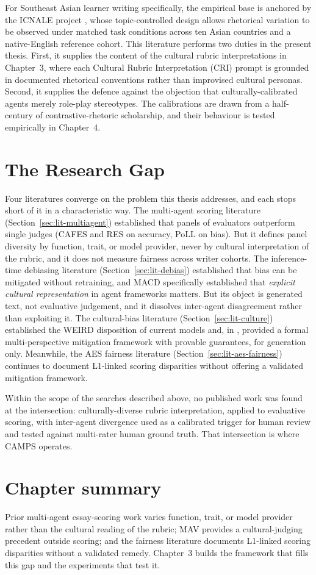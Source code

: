 For Southeast Asian learner writing specifically, the empirical base
is anchored by the ICNALE project \citep{ishikawa2023icnale}, whose
topic-controlled design allows rhetorical variation to be observed
under matched task conditions across ten Asian countries and a
native-English reference cohort. This literature performs two duties in
the present thesis. First, it supplies the content of the cultural rubric
interpretations in Chapter~3, where each Cultural Rubric
Interpretation (CRI) prompt is grounded in
documented rhetorical conventions rather than improvised cultural
personas. Second, it supplies the defence against the objection that
culturally-calibrated agents merely role-play stereotypes. The
calibrations are drawn from a half-century of contrastive-rhetoric
scholarship, and their behaviour is tested empirically in Chapter~4.

\section{The Research Gap}
\label{sec:lit-gap}

Four literatures converge on the problem this thesis addresses, and
each stops short of it in a characteristic way. The multi-agent scoring
literature (Section~\ref{sec:lit-multiagent}) established that panels
of evaluators outperform single judges (CAFES and RES on accuracy,
PoLL on bias). But it defines panel diversity by function, trait, or
model provider, never by cultural interpretation of the rubric, and it
does not measure fairness across writer cohorts. The inference-time
debiasing literature (Section~\ref{sec:lit-debias}) established that
bias can be mitigated without retraining, and MACD specifically
established that \emph{explicit cultural representation} in agent
frameworks matters. But its object is generated text, not evaluative
judgement, and it dissolves inter-agent disagreement rather than
exploiting it. The cultural-bias literature
(Section~\ref{sec:lit-culture}) established the WEIRD disposition of
current models and, in \citet{dorleon2026uncovering}, provided a formal
multi-perspective mitigation framework with provable guarantees, for
generation only. Meanwhile, the AES fairness literature
(Section~\ref{sec:lit-aes-fairness}) continues to document L1-linked
scoring disparities without offering a validated mitigation framework.

Within the scope of the searches described above, no published work
was found at the intersection: culturally-diverse rubric
interpretation, applied to evaluative scoring, with inter-agent
divergence used as a calibrated trigger for human review and tested
against multi-rater human ground truth.
That intersection is where CAMPS operates.

\section*{Chapter summary}
Prior multi-agent essay-scoring work varies function, trait, or
model provider rather than the cultural reading of the rubric; MAV
provides a cultural-judging precedent outside scoring; and the
fairness literature documents L1-linked scoring disparities without
a validated remedy. Chapter~3 builds the
framework that fills this gap and the experiments that test it.
